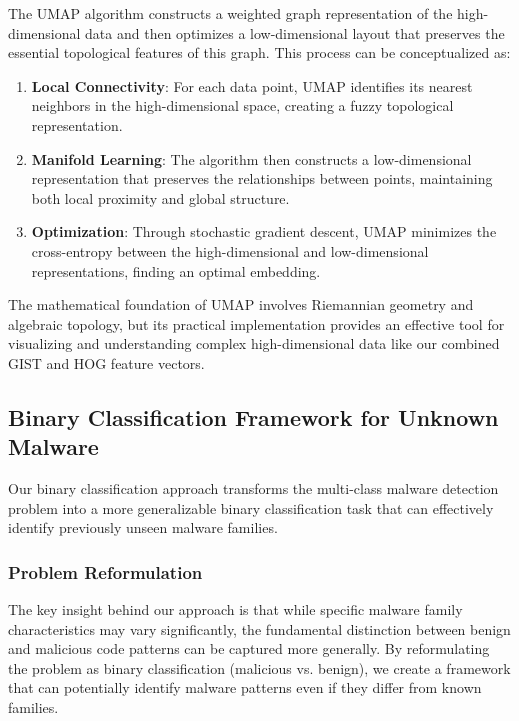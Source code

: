 The UMAP algorithm constructs a weighted graph representation of the high-dimensional data and then optimizes a low-dimensional layout that preserves the essential topological features of this graph. This process can be conceptualized as:

\begin{enumerate}
    \item \textbf{Local Connectivity}: For each data point, UMAP identifies its nearest neighbors in the high-dimensional space, creating a fuzzy topological representation.
    
    \item \textbf{Manifold Learning}: The algorithm then constructs a low-dimensional representation that preserves the relationships between points, maintaining both local proximity and global structure.
    
    \item \textbf{Optimization}: Through stochastic gradient descent, UMAP minimizes the cross-entropy between the high-dimensional and low-dimensional representations, finding an optimal embedding.
\end{enumerate}

The mathematical foundation of UMAP involves Riemannian geometry and algebraic topology, but its practical implementation provides an effective tool for visualizing and understanding complex high-dimensional data like our combined GIST and HOG feature vectors.

\subsection{Binary Classification Framework for Unknown Malware}
\label{subsec:binary-classification}

Our binary classification approach transforms the multi-class malware detection problem into a more generalizable binary classification task that can effectively identify previously unseen malware families.

\subsubsection{Problem Reformulation}

The key insight behind our approach is that while specific malware family characteristics may vary significantly, the fundamental distinction between benign and malicious code patterns can be captured more generally. By reformulating the problem as binary classification (malicious vs. benign), we create a framework that can potentially identify malware patterns even if they differ from known families.

